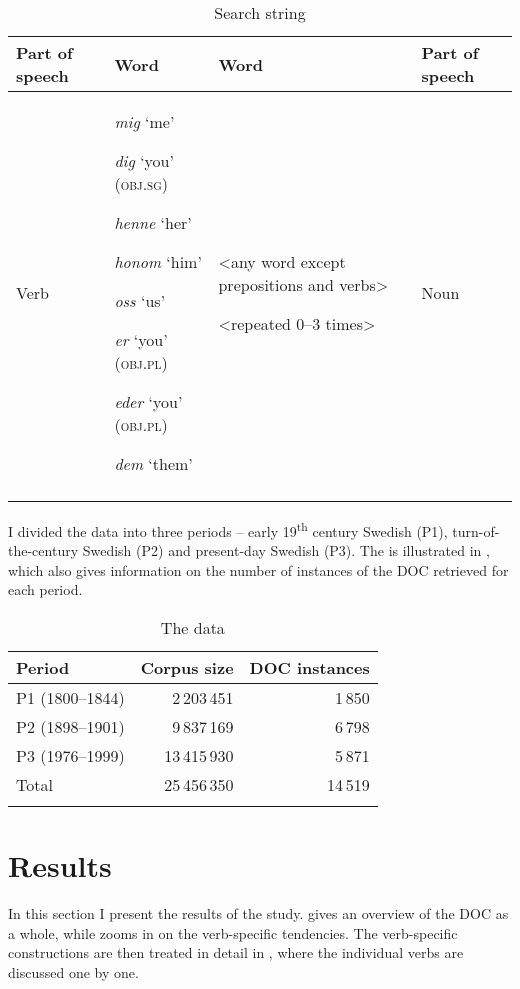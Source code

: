 \documentclass[output=paper]{langscibook}
\begin{document}
\begin{table}
\begin{tabularx}{\textwidth}{lQQl}
\lsptoprule
Part of speech & Word & Word & Part of speech\\
\midrule
Verb & \textit{mig} ‘me’

\textit{dig} ‘you’ (\textsc{obj}.\textsc{sg})

\textit{henne} ‘her’

\textit{honom} ‘him’

\textit{oss} ‘us’

\textit{er} ‘you’ (\textsc{obj}.\textsc{pl})

\textit{eder} ‘you’ (\textsc{obj}.\textsc{pl})

\textit{dem} ‘them’ & <any word except prepositions and verbs>

<repeated 0–3 times> & Noun\\
\lspbottomrule
\end{tabularx}
\caption{Search string}
\label{fig:valdeson:2}
\end{table}


I divided the data into three periods – early 19\textsuperscript{th} century Swedish (P1), turn-of-the-century Swedish (P2) and present-day Swedish (P3). The  is illustrated in , which also gives information on the number of instances of the DOC retrieved for each period.


\begin{table}
\caption{The data}
\label{tab:valdeson:3}
\begin{tabular}{lrr}
\lsptoprule
Period & Corpus size & DOC instances\\
\midrule
P1 (1800–1844) & 2\,203\,451 & 1\,850\\
P2 (1898–1901) & 9\,837\,169 & 6\,798\\
P3 (1976–1999) & 13\,415\,930 & 5\,871\\
\midrule
Total & 25\,456\,350 & 14\,519\\
\lspbottomrule
\end{tabular}
\end{table}

\section{Results}\label{sec:valdeson:5}


In this section I present the results of the study.  gives an overview of the DOC as a whole, while  zooms in on the verb-specific tendencies. The verb-specific constructions are then treated in detail in , where the individual verbs are discussed one by one.
\end{document}
